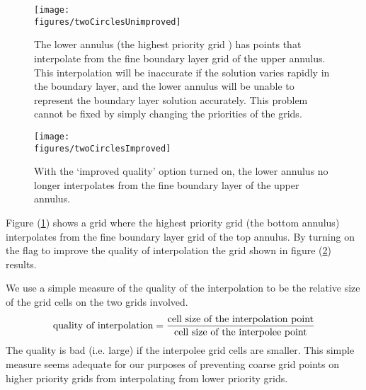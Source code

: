 \begin{figure}[hbt]
  \begin{center}
   \texttt{[image: \\figures/twoCirclesUnimproved]}
  \caption{The lower annulus (the highest priority grid ) has points that interpolate from the 
           fine boundary layer grid of the upper annulus. This interpolation will be inaccurate
           if the solution varies rapidly in the boundary layer, and the lower annulus will be unable
           to represent the boundary layer solution accurately. This problem cannot be fixed
           by simply changing the priorities of the grids.  } \label{fig:twoCirclesUnimproved}
  \end{center}
\end{figure}
\begin{figure}[hbt]
  \begin{center}
   \texttt{[image: \\figures/twoCirclesImproved]}
  \caption{With the `improved quality' option turned on, the lower annulus no longer interpolates
       from the fine boundary layer of the upper annulus. } \label{fig:twoCirclesImproved}
  \end{center}
\end{figure}

Figure (\ref{fig:twoCirclesUnimproved}) shows a grid where the highest
priority grid (the bottom annulus) interpolates from the fine boundary
layer grid of the top annulus. By turning on the flag to improve the
quality of interpolation the grid shown in figure (\ref{fig:twoCirclesImproved})
results. 


We use a simple measure of the quality of the interpolation to be the relative size of the
grid cells on the two grids involved. 
\[ 
    \text{quality of interpolation} = { \text{cell size of the interpolation point} \over
                                        \text{cell size of the interpolee point} }
\]
The quality is bad (i.e. large) if the interpolee grid cells are smaller.
This simple measure seems adequate for our purposes of preventing coarse grid points
on higher priority grids from interpolating from lower priority grids.


